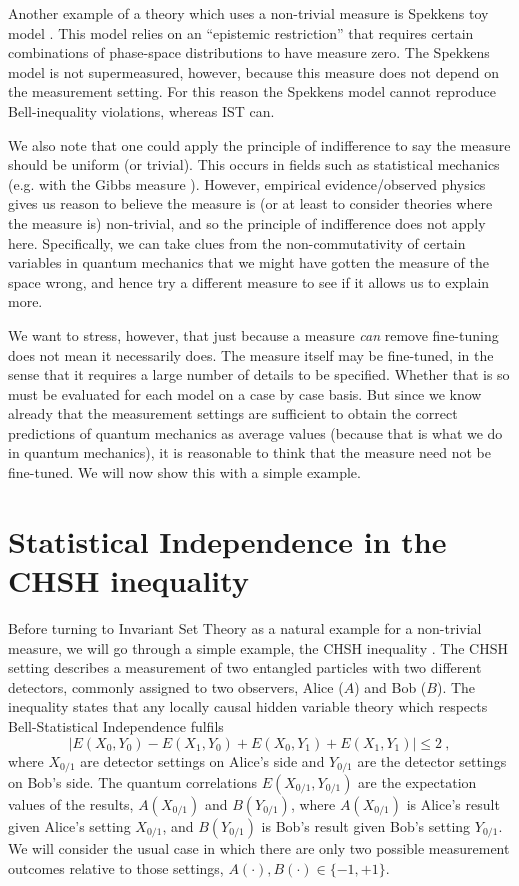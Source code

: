 \documentclass[12pt]{article}
\begin{document}
Another example of a theory which uses a non-trivial measure is Spekkens toy model \mbox{\cite{Spekkens2007Evidence}}. This model relies on an ``epistemic restriction'' that requires certain combinations of phase-space distributions to have measure zero. The Spekkens model is not supermeasured, however, because this measure does not depend on the measurement setting. For this reason the Spekkens model cannot reproduce Bell-inequality violations, whereas {\sc IST} can.

We also note that one could apply the principle of indifference to say the measure should be uniform (or trivial). This occurs in fields such as statistical mechanics (e.g. with the Gibbs measure \mbox{\cite{georgii2011gibbs}}). However, empirical evidence/observed physics gives us reason to believe the measure is (or at least to consider theories where the measure is) non-trivial, and so the principle of indifference does not apply here. Specifically, we can take clues from the non-commutativity of certain variables in quantum mechanics that we might have gotten the measure of the space wrong, and hence try a different measure to see if it allows us to explain more.

We want to stress, however, that just because a measure \emph{can} remove fine-tuning does not mean it necessarily does. The measure itself may be fine-tuned, in the sense that it requires a large number of details to be specified. Whether that is so must be evaluated for each model on a case by case basis. But since we know already that the measurement settings are sufficient to obtain the correct predictions of quantum mechanics as average values (because that is what we do in quantum mechanics), it is reasonable to think that the measure need not be fine-tuned. We will now show this with a simple example.


\section{Statistical Independence in the CHSH inequality}
\label{CHSH}

Before turning to Invariant Set Theory as a natural example for a non-trivial measure, we will go through a simple example, the {\sc CHSH} inequality \cite{Clauser1969CHSH}.
The {\sc CHSH} setting describes a measurement of two entangled particles with two different detectors, commonly assigned to two observers, Alice ($A$) and Bob ($B$). The inequality states that any locally causal hidden variable theory which respects Bell-Statistical Independence fulfils
\begin{equation}
   \big| E(X_0,Y_0)-E(X_1,Y_0)+E(X_0,Y_1)+E(X_1,Y_1) \big| \leq 2~,
\end{equation}
where $X_{0/1}$ are detector settings on Alice's side and $Y_{0/1}$ are the detector settings on Bob's side. The quantum correlations $E(X_{0/1},Y_{0/1})$ are the expectation values of the results, $A(X_{0/1})$ and $B(Y_{0/1})$, where $A(X_{0/1})$ is Alice's result given Alice's setting $X_{0/1}$, and $B(Y_{0/1})$ is Bob's result given Bob's setting $Y_{0/1}$. 
We will consider the usual case in which there are only two possible measurement outcomes relative to those settings, $A(\cdot),B(\cdot) \in \{-1,+1 \}$.
\end{document}
